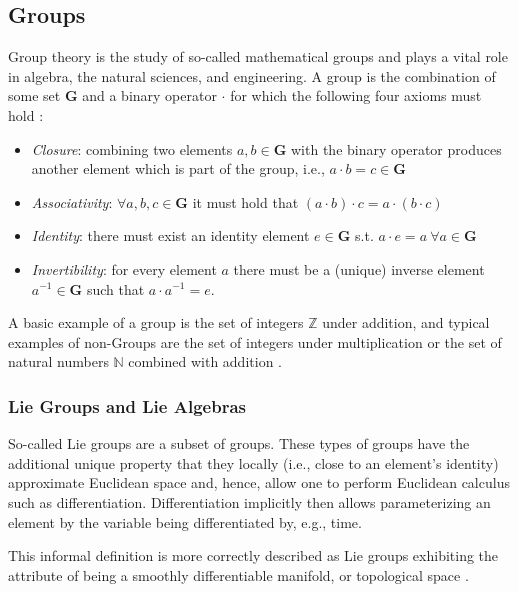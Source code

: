 \documentclass[headsepline, hidelinks, footsepline, footinclude=false, oneside, fontsize=11pt, paper=a4, listof=totoc, bibliography=totoc]{scrbook}
\begin{document}
\subsection{Groups \label{groups}}
\label{sec:orgc365e94}
    Group theory is the study of so-called mathematical groups and plays a vital role in algebra, the natural sciences, and engineering. 
A group is the combination of some set \(\mathbf{G}\) and a binary operator \(\cdot\) for which the following four axioms must hold \cite{murrayMathematicalIntroductionRobotic1994}: 
\begin{itemize}
\item \emph{Closure}: combining two elements \(a, b \in \mathbf{G}\) with the binary operator produces another element which is part of the group, i.e., \(a\cdot b=c\in \mathbf{G}\)
\item \emph{Associativity}: \(\forall a, b, c \in \mathbf{G}\) it must hold that \((a\cdot b) \cdot c = a \cdot (b\cdot c)\)
\item \emph{Identity}: there must exist an identity element \(e \in \mathbf{G}\) s.t. \(a \cdot e = a ~\forall a \in \mathbf{G}\)
\item \emph{Invertibility}: for every element \(a\) there must be a (unique) inverse element \(a^{-1} \in \mathbf{G}\) such that \(a \cdot a^{-1} = e\).
\end{itemize}

A basic example of a group is the set of integers \(\mathbb{Z}\) under addition, and typical examples
of non-Groups are the set of integers under multiplication or the set of natural numbers \(\mathbb{N}\)
combined with addition \cite{langAlgebra2002}.

\subsubsection{Lie Groups and Lie Algebras \label{lie-groups}}
\label{sec:org04d1374}
    So-called Lie groups are a subset of groups. These types of groups have the additional unique property that they
locally (i.e., close to an element's identity) approximate Euclidean space and, hence, allow one to perform Euclidean calculus such as differentiation.
Differentiation implicitly then allows parameterizing an element by the variable being differentiated by, e.g., time.

This informal definition is more correctly described as Lie groups exhibiting the attribute of being a smoothly
differentiable manifold, or topological space \cite{adamsLecturesExceptionalLie1996}.
\end{document}
